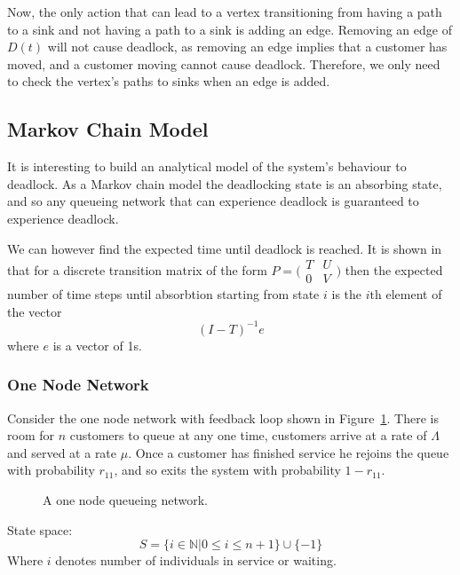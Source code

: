 \documentclass{article}
\begin{document}
Now, the only action that can lead to a vertex transitioning from having a path to a sink and not having a path to a sink is adding an edge.
Removing an edge of $D(t)$ will not cause deadlock, as removing an edge implies that a customer has moved, and a customer moving cannot cause deadlock.
Therefore, we only need to check the vertex's paths to sinks when an edge is added.

\subsection{Markov Chain Model}

It is interesting to build an analytical model of the system's behaviour to deadlock.
As a Markov chain model the deadlocking state is an absorbing state, and so any queueing network that can experience deadlock is guaranteed to experience deadlock.

We can however find the expected time until deadlock is reached.
It is shown in \cite{stewart09} that for a discrete transition matrix of the form $P = \bigl(\begin{smallmatrix} T & U\\ 0 & V \end{smallmatrix} \bigr)$ then the expected number of time steps until absorbtion starting from state $i$ is the $i\text{th}$ element of the vector
\begin{equation}
  (I - T)^{-1}e
\end{equation}
where $e$ is a vector of 1s.

\subsubsection{One Node Network}
Consider the one node network with feedback loop shown in Figure~\ref{fig:queueingnetwork_1node}.
There is room for $n$ customers to queue at any one time, customers arrive at a rate of $\Lambda$ and served at a rate $\mu$.
Once a customer has finished service he rejoins the queue with probability $r_{11}$, and so exits the system with probability $1 - r_{11}$.

\begin{figure}[H]
  
  \caption{A one node queueing network.}
  \label{fig:queueingnetwork_1node}
\end{figure}

State space:
        \[S = \{i\in\mathbb{N}| 0 \leq i \leq n + 1
        \}\cup\{-1\}\]
Where \(i\) denotes number of individuals in service or waiting.
\end{document}
